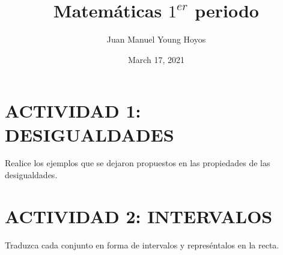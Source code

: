 \documentclass[12pt, letterpaper, twoside]{article}
\title{Matemáticas $1^{er}$ periodo}
\author{Juan Manuel Young Hoyos}
\date{March 17, 2021}
\begin{document}
\maketitle

\section*{ACTIVIDAD 1: DESIGUALDADES}

Realice los ejemplos que se dejaron propuestos en las propiedades de las desigualdades.

\section*{ACTIVIDAD 2: INTERVALOS}

Traduzca cada conjunto en forma de intervalos y represéntalos en la recta.
\end{document}
